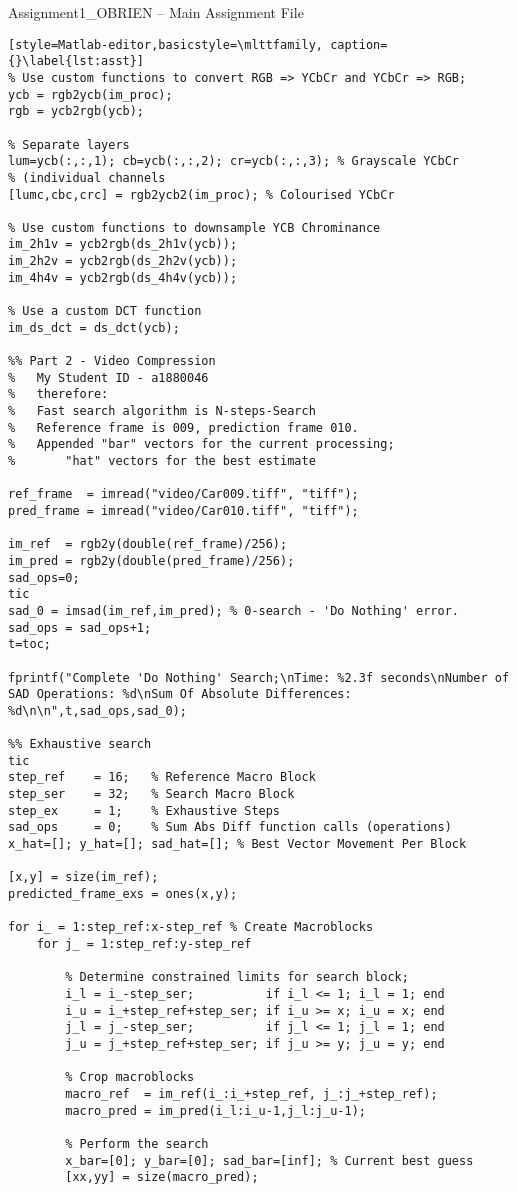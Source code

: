 \begin{codeblock}{Assignment1\_OBRIEN -- Main Assignment File}
\begin{lstlisting}[style=Matlab-editor,basicstyle=\mlttfamily, caption={}\label{lst:asst}]
% Use custom functions to convert RGB => YCbCr and YCbCr => RGB;
ycb = rgb2ycb(im_proc);
rgb = ycb2rgb(ycb);

% Separate layers
lum=ycb(:,:,1); cb=ycb(:,:,2); cr=ycb(:,:,3); % Grayscale YCbCr
% (individual channels
[lumc,cbc,crc] = rgb2ycb2(im_proc); % Colourised YCbCr

% Use custom functions to downsample YCB Chrominance
im_2h1v = ycb2rgb(ds_2h1v(ycb));
im_2h2v = ycb2rgb(ds_2h2v(ycb));
im_4h4v = ycb2rgb(ds_4h4v(ycb));

% Use a custom DCT function
im_ds_dct = ds_dct(ycb);

%% Part 2 - Video Compression
%   My Student ID - a1880046
%   therefore:
%   Fast search algorithm is N-steps-Search
%   Reference frame is 009, prediction frame 010.
%   Appended "bar" vectors for the current processing;
%       "hat" vectors for the best estimate

ref_frame  = imread("video/Car009.tiff", "tiff"); 
pred_frame = imread("video/Car010.tiff", "tiff"); 

im_ref  = rgb2y(double(ref_frame)/256);
im_pred = rgb2y(double(pred_frame)/256);
sad_ops=0;
tic
sad_0 = imsad(im_ref,im_pred); % 0-search - 'Do Nothing' error.
sad_ops = sad_ops+1;
t=toc;

fprintf("Complete 'Do Nothing' Search;\nTime: %2.3f seconds\nNumber of SAD Operations: %d\nSum Of Absolute Differences: %d\n\n",t,sad_ops,sad_0);

%% Exhaustive search
tic
step_ref    = 16;   % Reference Macro Block
step_ser    = 32;   % Search Macro Block
step_ex     = 1;    % Exhaustive Steps
sad_ops     = 0;    % Sum Abs Diff function calls (operations)
x_hat=[]; y_hat=[]; sad_hat=[]; % Best Vector Movement Per Block

[x,y] = size(im_ref);
predicted_frame_exs = ones(x,y);

for i_ = 1:step_ref:x-step_ref % Create Macroblocks
    for j_ = 1:step_ref:y-step_ref 

        % Determine constrained limits for search block; 
        i_l = i_-step_ser;          if i_l <= 1; i_l = 1; end
        i_u = i_+step_ref+step_ser; if i_u >= x; i_u = x; end
        j_l = j_-step_ser;          if j_l <= 1; j_l = 1; end
        j_u = j_+step_ref+step_ser; if j_u >= y; j_u = y; end

        % Crop macroblocks
        macro_ref  = im_ref(i_:i_+step_ref, j_:j_+step_ref);
        macro_pred = im_pred(i_l:i_u-1,j_l:j_u-1); 

        % Perform the search
        x_bar=[0]; y_bar=[0]; sad_bar=[inf]; % Current best guess
        [xx,yy] = size(macro_pred);


\end{lstlisting}
\end{codeblock}
